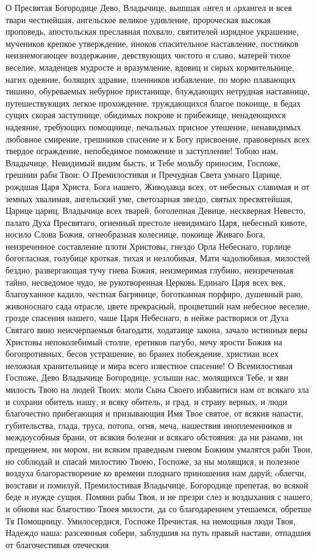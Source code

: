\begin{mymulticols}
О Пресвятая Богородице Дево, Владычице, вышшая aнгел и aрхангел и всея твари честнейшая, ангельское великое удивление, пророческая высокая проповедь, апостольская преславная похвало, святителей изрядное украшение, мучеников крепкое утверждение, иноков спасительное наставление, постников неизнемогающее воздержание, девствующих чистото и славо, матерей тихое веселие, младенцев мудросте и вразумление, вдовиц и сирых кормительнице, нагих одеяние, болящих здравие, пленников избавление, по морю плавающих тишино, обуреваемых небурное пристанище, блуждающих нетрудная наставнице, путешествующих легкое прохождение, труждающихся благое покоище, в бедах сущих скорая заступнице, обидимых покрове и прибежище, ненадеющихся надеяние, требующих помощнице, печальных присное утешение, ненавидимых любовное смирение, грешников спасение и к Богу присвоение, правоверных всех твердое ограждение, непобедимое поможение и заступление! Тобою нам, Владычице, Невидимый видим бысть, и Тебе мольбу приносим, Госпоже, грешнии раби Твои: О Премилостивая и Пречудная Света умнаго Царице, рождшая Царя Христа, Бога нашего, Живодавца всех, от небесных славимая и от земных хвалимая, ангельский уме, светозарная звездо, святых пресвятейшая, Царице цариц, Владычице всех тварей, боголепная Девице, нескверная Невесто, палато Духа Пресвятаго, огненный престоле невидимаго Царя, небесный кивоте, носило Слова Божия, огнеобразная колеснице, покоище Живаго Бога, неизреченное составление плоти Христовы, гнездо Орла Небеснаго, горлице богогласная, голубице кроткая, тихая и незлобивая, Мати чадолюбивая, милостей бездно, развергающая тучу гнева Божия, неизмеримая глубино, неизреченная тайно, несведомое чудо, не рукотворенная Церковь Единаго Царя всех век, благоуханное кадило, честная багрянице, боготканная порфиро, душевный раю, живоноснаго сада отрасле, цвете прекрасный, процветший нам небесное веселие, грозде спасения нашего, чаше Царя Небеснаго, в нейже растворися от Духа Святаго вино неисчерпаемыя благодати, ходатаице закона, зачало истинныя веры Христовы непоколебимый столпе, еретиков пагубо, мечу ярости Божия на богопротивных, бесов устрашение, во бранех побеждение, христиан всех неложная хранительнице и мира всего известное спасение! О Всемилостивая Госпоже, Дево Владычице Богородице, услыши нас, молящихся Тебе, и яви милость Твою на людей Твоих: моли Сына Своего избавитися нам от всякаго зла и сохрани обитель нашу, и всяку обитель, и град, и страну верных, и люди благочестно прибегающия и призывающия Имя Твое святое, от всякия напасти, губительства, глада, труса, потопа, огня, меча, нашествия иноплеменников и междоусобныя брани, от всякия болезни и всякаго обстояния: да ни ранами, ни прещением, ни мором, ни всяким праведным гневом Божиим умалятся раби Твои, но соблюдай и спасай милостию Твоею, Госпоже, за ны молящися, и полезное воздуха благорастворение ко времени плоднаго приношения нам даруй; oблегчи, возстави и помилуй, Премилостивая Владычице, Богородице препетая, во всякой беде и нужде сущия. Помяни рабы Твоя, и не презри слез и воздыхания с нашего, и обнови нас благостию Твоея милости, да со благодарением утешаемся, обретше Тя Помощницу. Умилосердися, Госпоже Пречистая, на немощныя люди Твоя, Надеждо наша: разсеянныя собери, заблудшия на путь правый настави, отпадшия от благочестивыя отеческия 
\end{mymulticols}
